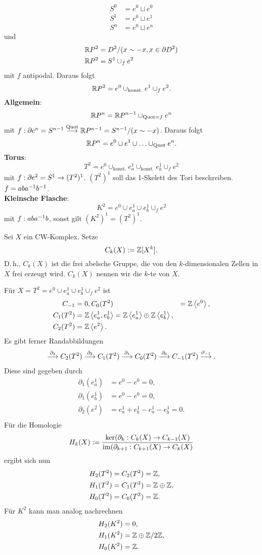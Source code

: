 \Bsp{}
\begin{align*}
S^0 &= e^0 \sqcup e^0\\
S^1 &= e^0\sqcup e^1\\
S^n &= e^0 \sqcup e^n
\end{align*}
und
\begin{align*}
\mathbb{R} P^2 &= D^2 /(x \sim -x, x \in \partial D^2)\\
\mathbb{R} P^2 &= S^1\cup_f e^2
\end{align*}
mit $f$ antipodal. Daraus folgt
\[ \mathbb{R} P^2 = e^0\cup_{\mathrm{konst.}} e^1 \cup_f e^2. \]
\textbf{Allgemein}:
\[ \mathbb{R} P^n = \mathbb{R} P^{n-1} \cup_{\mathrm{Quot} = f}e^n \]
mit $f : \partial e^n = S^{n-1} \overset{\mathrm{Quot}}{\longrightarrow} \mathbb{R} P^{n-1} = S^{n-1}/(x\sim - x)$.
Daraus folgt
\[ \mathbb{R} P^n = e^0 \cup e^1 \cup \ldots \cup_{\mathrm{Quot}} e^n. \]
\textbf{Torus}:
\[ T^2 = e^0 \cup_{\mathrm{konst.}} e^1_a \cup_{\mathrm{konst.}} e^1_b \cup_f e^2 \]
mit $f : \partial e^2 = S^1 \overset{}{\rightarrow} (T^2)^1$. $(T^2)^1$ soll das 1-Skelett des Tori beschreiben. $f = aba^{-1} b^{-1}$.\\
\textbf{Kleinsche Flasche}:
\[ K^2 = e^0 \cup e^1_a \cup e^1_b \cup_f e^2  \]
mit $f : aba^{-1} b$, sonst gilt $(K^2)^1 = (T^2)^1$.

\Def{}
Sei $X$ ein CW-Komplex. Setze
\[ C_k(X) := \mathbb{Z}[X^k]. \]
D.\,h., $C_k(X)$ ist die frei abelsche Gruppe, die von den $k$-dimensionalen Zellen in $X$ frei erzeugt wird. $C_k(X)$ nennen wir die $k$-te  von $X$.

\Bsp{}
Für $X = T^2 = e^0 \cup e_a^1\cup e_b^1 \cup_f e^2$ ist
\begin{align*}
C_{-1} &= 0,
C_0(T^2) &= \mathbb{Z}\left<e^0\right>,\\
C_1(T^2) &= \mathbb{Z}\left<e^1_a, e^1_b\right> = \mathbb{Z}\left<e^1_a\right> \oplus \mathbb{Z}\left<e^1_b\right>,\\
C_2(T^2) &= \mathbb{Z} \left<e^2\right>.
\end{align*}
Es gibt ferner Randabbildungen
\begin{align*}
\overset{\partial_3}{\longrightarrow} C_2(T^2) \overset{\partial_2}{\longrightarrow}
C_1(T^2) \overset{\partial_1}{\longrightarrow}
C_0(T^2) \overset{\partial_0}{\longrightarrow}
C_{-1}(T^2) \overset{\partial_{-1}}{\longrightarrow}.
\end{align*}
Diese sind gegeben durch
\begin{align*}
\partial_1(e^1_a) &= e^0 - e^0 = 0,\\
\partial_1(e^1_b) &= e^0 - e^0 = 0,\\
\partial_2(e^2) &= e^1_a + e^1_b - e^1_a - e^1_b = 0.\\
\end{align*}
Für die Homologie
\[ H_k(X) 
:=
\frac{ \ker (\partial_k : C_k(X) \overset{}{\rightarrow} C_{k-1}(X)}{ \mathrm{im}(\partial_{k+1} : C_{k+1}(X) \overset{}{\rightarrow} C_k(X) }
\]
ergibt sich nun
\begin{align*}
H_2(T^2) &= C_2(T^2) = \mathbb{Z},\\
H_1(T^2) &= C_1(T^2) = \mathbb{Z}\oplus \mathbb{Z},\\
H_0(T^2) &= C_0(T^2) = \mathbb{Z}.
\end{align*}
Für $K^2$ kann man analog nachrechnen
\begin{align*}
H_2(K^2) &= 0,\\
H_1(K^2) &= \mathbb{Z} \oplus \mathbb{Z} /2\mathbb{Z} ,\\
H_0(K^2) &= \mathbb{Z}.
\end{align*}



